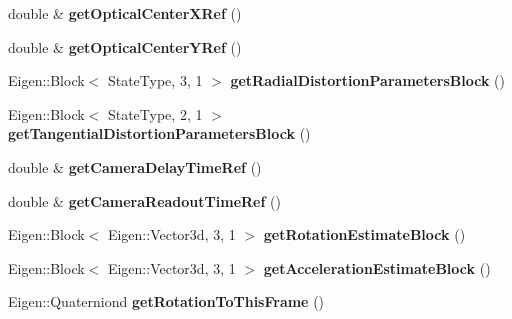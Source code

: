 \begin{DoxyCompactItemize}
\item 
\hypertarget{class_filter_state_a3fc41a17c48851340acbfdfc9c164f01}{double \& {\bfseries get\-Optical\-Center\-X\-Ref} ()}\label{class_filter_state_a3fc41a17c48851340acbfdfc9c164f01}

\item 
\hypertarget{class_filter_state_a7ddf9eca9ab6cad9bee85ee6cfc80de0}{double \& {\bfseries get\-Optical\-Center\-Y\-Ref} ()}\label{class_filter_state_a7ddf9eca9ab6cad9bee85ee6cfc80de0}

\item 
\hypertarget{class_filter_state_aa326b846da2b55623e4d219d357e6b57}{Eigen\-::\-Block$<$ State\-Type, 3, 1 $>$ {\bfseries get\-Radial\-Distortion\-Parameters\-Block} ()}\label{class_filter_state_aa326b846da2b55623e4d219d357e6b57}

\item 
\hypertarget{class_filter_state_ad4b9c49509f2cc303c554969a8264c89}{Eigen\-::\-Block$<$ State\-Type, 2, 1 $>$ {\bfseries get\-Tangential\-Distortion\-Parameters\-Block} ()}\label{class_filter_state_ad4b9c49509f2cc303c554969a8264c89}

\item 
\hypertarget{class_filter_state_a6563a73bad1016317018c85d53380962}{double \& {\bfseries get\-Camera\-Delay\-Time\-Ref} ()}\label{class_filter_state_a6563a73bad1016317018c85d53380962}

\item 
\hypertarget{class_filter_state_ab9d3e7cad1ae09ed35bcc528c0e8ef45}{double \& {\bfseries get\-Camera\-Readout\-Time\-Ref} ()}\label{class_filter_state_ab9d3e7cad1ae09ed35bcc528c0e8ef45}

\item 
\hypertarget{class_filter_state_a928bd10a77b39859d6f108f8dd8ae0e9}{Eigen\-::\-Block$<$ Eigen\-::\-Vector3d, 3, 1 $>$ {\bfseries get\-Rotation\-Estimate\-Block} ()}\label{class_filter_state_a928bd10a77b39859d6f108f8dd8ae0e9}

\item 
\hypertarget{class_filter_state_a4436166f7dbaf6c002b6fc2832b4f136}{Eigen\-::\-Block$<$ Eigen\-::\-Vector3d, 3, 1 $>$ {\bfseries get\-Acceleration\-Estimate\-Block} ()}\label{class_filter_state_a4436166f7dbaf6c002b6fc2832b4f136}

\item 
\hypertarget{class_filter_state_ab3d02580cdbd89bc64276467d7c1c854}{Eigen\-::\-Quaterniond {\bfseries get\-Rotation\-To\-This\-Frame} ()}\label{class_filter_state_ab3d02580cdbd89bc64276467d7c1c854}


\end{DoxyCompactItemize}
